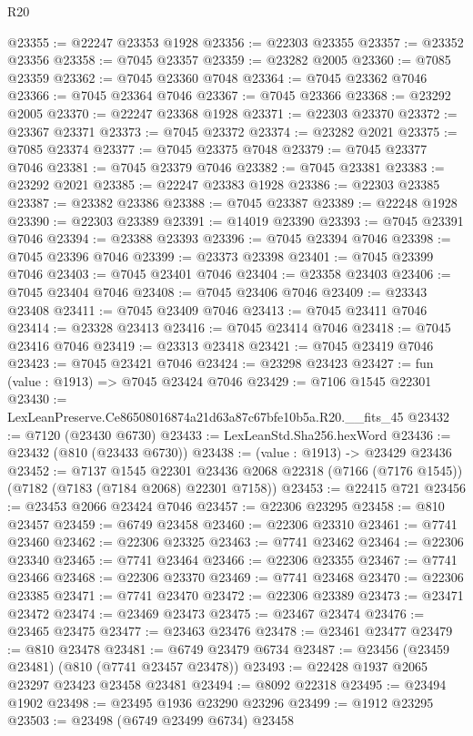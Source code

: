\begin{lexlean}{R20}
\begin{coremodule}
{@23355 := @22247 @23353 @1928
@23356 := @22303 @23355
@23357 := @23352 @23356
@23358 := @7045 @23357
@23359 := @23282 @2005
@23360 := @7085 @23359
@23362 := @7045 @23360 @7048
@23364 := @7045 @23362 @7046
@23366 := @7045 @23364 @7046
@23367 := @7045 @23366
@23368 := @23292 @2005
@23370 := @22247 @23368 @1928
@23371 := @22303 @23370
@23372 := @23367 @23371
@23373 := @7045 @23372
@23374 := @23282 @2021
@23375 := @7085 @23374
@23377 := @7045 @23375 @7048
@23379 := @7045 @23377 @7046
@23381 := @7045 @23379 @7046
@23382 := @7045 @23381
@23383 := @23292 @2021
@23385 := @22247 @23383 @1928
@23386 := @22303 @23385
@23387 := @23382 @23386
@23388 := @7045 @23387
@23389 := @22248 @1928
@23390 := @22303 @23389
@23391 := @14019 @23390
@23393 := @7045 @23391 @7046
@23394 := @23388 @23393
@23396 := @7045 @23394 @7046
@23398 := @7045 @23396 @7046
@23399 := @23373 @23398
@23401 := @7045 @23399 @7046
@23403 := @7045 @23401 @7046
@23404 := @23358 @23403
@23406 := @7045 @23404 @7046
@23408 := @7045 @23406 @7046
@23409 := @23343 @23408
@23411 := @7045 @23409 @7046
@23413 := @7045 @23411 @7046
@23414 := @23328 @23413
@23416 := @7045 @23414 @7046
@23418 := @7045 @23416 @7046
@23419 := @23313 @23418
@23421 := @7045 @23419 @7046
@23423 := @7045 @23421 @7046
@23424 := @23298 @23423
@23427 := fun (value : @1913) => @7045 @23424 @7046
@23429 := @7106 @1545 @22301
@23430 := LexLeanPreserve.Ce86508016874a21d63a87c67bfe10b5a.R20.__fits_45
@23432 := @7120 (@23430 @6730)
@23433 := LexLeanStd.Sha256.hexWord
@23436 := @23432 (@810 (@23433 @6730))
@23438 := (value : @1913) -> @23429 @23436
@23452 := @7137
    @1545
    @22301
    @23436
    @2068
    @22318
    (@7166 (@7176 @1545))
    (@7182 (@7183 (@7184 @2068) @22301 @7158))
@23453 := @22415 @721
@23456 := @23453 @2066 @23424 @7046
@23457 := @22306 @23295
@23458 := @810 @23457
@23459 := @6749 @23458
@23460 := @22306 @23310
@23461 := @7741 @23460
@23462 := @22306 @23325
@23463 := @7741 @23462
@23464 := @22306 @23340
@23465 := @7741 @23464
@23466 := @22306 @23355
@23467 := @7741 @23466
@23468 := @22306 @23370
@23469 := @7741 @23468
@23470 := @22306 @23385
@23471 := @7741 @23470
@23472 := @22306 @23389
@23473 := @23471 @23472
@23474 := @23469 @23473
@23475 := @23467 @23474
@23476 := @23465 @23475
@23477 := @23463 @23476
@23478 := @23461 @23477
@23479 := @810 @23478
@23481 := @6749 @23479 @6734
@23487 := @23456 (@23459 @23481) (@810 (@7741 @23457 @23478))
@23493 := @22428 @1937 @2065 @23297 @23423 @23458 @23481
@23494 := @8092 @22318
@23495 := @23494 @1902
@23498 := @23495 @1936 @23290 @23296
@23499 := @1912 @23295
@23503 := @23498 (@6749 @23499 @6734) @23458
}
\end{coremodule}
\end{lexlean}
